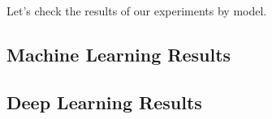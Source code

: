Let's check the results of our experiments by model.

\subsection{Machine Learning Results}






\subsection{Deep Learning Results}






